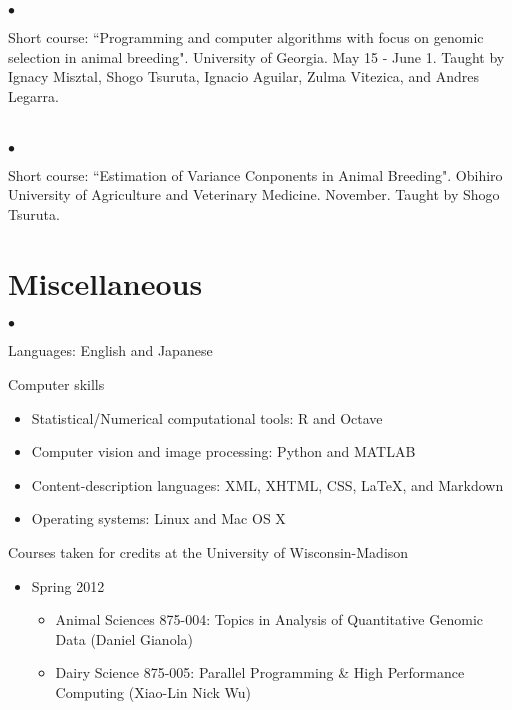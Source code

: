 \documentclass[margin,line,10pt]{res}
\newenvironment{list2}{
  \begin{list}{$\bullet$}{%
      \setlength{\itemsep}{0in}
      \setlength{\parsep}{0in} \setlength{\parskip}{0in}
      \setlength{\topsep}{0in} \setlength{\partopsep}{0in} 
      \setlength{\leftmargin}{0.2in}}}{\end{list}}
\begin{document}
\begin{resume}
\begin{list2}
\item Short course: ``Programming and computer algorithms with focus on genomic selection in animal breeding".  University of Georgia. May 15 - June 1.  
Taught by Ignacy Misztal, Shogo Tsuruta, Ignacio Aguilar, Zulma Vitezica, and  Andres Legarra. 
\end{list2}  

\section{}
\begin{list2}
\item Short course: ``Estimation of Variance Conponents in Animal Breeding". Obihiro University of Agriculture and Veterinary Medicine. November. 
Taught by Shogo Tsuruta.  
\end{list2}  



\vspace{0.5cm}
\section{\sc Miscellaneous} 
\begin{list2}
\item Languages: English and Japanese
  \vspace{0.2cm}
\item Computer skills 
  \begin{itemize}
  \item Statistical/Numerical computational tools: R and Octave
  \item Computer vision and image processing: Python and MATLAB
  \item Content-description languages: XML, XHTML, CSS, \LaTeX, and Markdown
  \item Operating systems: Linux and Mac OS X
  \end{itemize}
    \vspace{0.2cm}
\item Courses taken for credits at the University of Wisconsin-Madison 
  \begin{itemize}

\item Spring 2012
\begin{itemize}
\item    Animal Sciences 875-004: Topics in Analysis of Quantitative Genomic Data (Daniel Gianola)
\item    Dairy Science 875-005: Parallel Programming \& High Performance Computing (Xiao-Lin Nick Wu)
\end{itemize}



\end{itemize}
\end{list2}
\end{resume}
\end{document}
